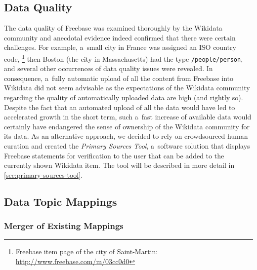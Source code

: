 \documentclass{acm_proc_article-sp}
\begin{document}
\subsection{Data Quality}
\label{sec:dataquality}

The data quality of Freebase was examined thoroughly by the Wikidata community
and anecdotal evidence indeed confirmed that there were certain challenges.
For example, a~small city in France was assigned an ISO country code,%
\footnote{Freebase item page of the city of Saint-Martin: \url{http://www.freebase.com/m/03cc0d0}}
then Boston (the city in Massachusetts) had the type \texttt{/people/person},
and several other occurrences of data quality issues were revealed.
In consequence, a~fully automatic upload of all the content from Freebase into Wikidata
did not seem advisable as the expectations of the Wikidata community regarding the
quality of automatically uploaded data are high (and rightly so).
Despite the fact that an automated upload of all the data
would have led to accelerated growth in the short term,
such a~fast increase of available data would certainly have endangered
the sense of ownership of the Wikidata community for its data.
As an alternative approach, we decided to rely on crowdsourced human curation
and created the \emph{Primary Sources Tool},
a~software solution that displays Freebase statements
for verification to the user that can be added to the currently shown Wikidata item.
The tool will be described in more detail in \autoref{sec:primary-sources-tool}.

\subsection{Data Topic Mappings}

\subsubsection{Merger of Existing Mappings}
\end{document}

